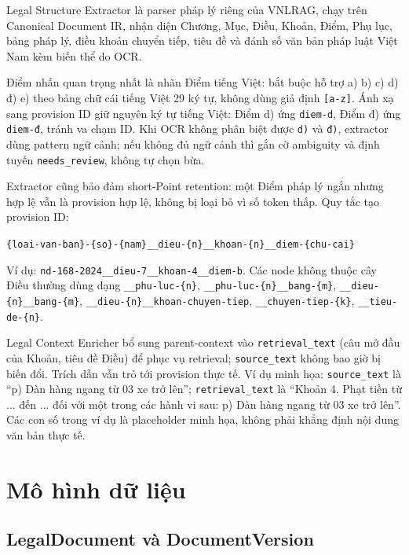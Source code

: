\documentclass[a4paper,12pt]{extreport}
\newcommand{\code}[1]{\texttt{#1}}
\begin{document}
Legal Structure Extractor là parser pháp lý riêng của VNLRAG, chạy trên Canonical Document IR, nhận diện Chương, Mục, Điều, Khoản, Điểm, Phụ lục, bảng pháp lý, điều khoản chuyển tiếp, tiêu đề và đánh số văn bản pháp luật Việt Nam kèm biến thể do OCR.

Điểm nhấn quan trọng nhất là nhãn Điểm tiếng Việt: bắt buộc hỗ trợ a) b) c) d) đ) e) theo bảng chữ cái tiếng Việt 29 ký tự, không dùng giả định \code{[a-z]}. Ánh xạ sang provision ID giữ nguyên ký tự tiếng Việt: Điểm d) ứng \code{diem-d}, Điểm đ) ứng \code{diem-đ}, tránh va chạm ID. Khi OCR không phân biệt được \code{d)} và \code{đ)}, extractor dùng pattern ngữ cảnh; nếu không đủ ngữ cảnh thì gắn cờ ambiguity và định tuyến \code{needs\_review}, không tự chọn bừa.

Extractor cũng bảo đảm short-Point retention: một Điểm pháp lý ngắn nhưng hợp lệ vẫn là provision hợp lệ, không bị loại bỏ vì số token thấp. Quy tắc tạo provision ID:

\begin{center}
\code{\{loai-van-ban\}\allowbreak-\{so\}\allowbreak-\{nam\}\allowbreak\_\_dieu\allowbreak-\{n\}\allowbreak\_\_khoan\allowbreak-\{n\}\allowbreak\_\_diem\allowbreak-\{chu-cai\}}
\end{center}

\begin{sloppypar}
Ví dụ: \code{nd-168-2024\_\_dieu-7\_\_khoan-4\_\_diem-b}. Các node không thuộc cây Điều thường dùng dạng \code{\_\_phu-luc-\{n\}}, \code{\_\_phu-luc-\{n\}\_\_bang-\{m\}}, \code{\_\_dieu-\{n\}\_\_bang-\{m\}}, \code{\_\_dieu-\{n\}\_\_khoan-chuyen-tiep}, \code{\_\_chuyen-tiep-\{k\}}, \code{\_\_tieu-de-\{n\}}.
\end{sloppypar}

Legal Context Enricher bổ sung parent-context vào \code{retrieval\_text} (câu mở đầu của Khoản, tiêu đề Điều) để phục vụ retrieval; \code{source\_text} không bao giờ bị biến đổi. Trích dẫn vẫn trỏ tới provision thực tế. Ví dụ minh họa: \code{source\_text} là ``p) Dàn hàng ngang từ 03 xe trở lên''; \code{retrieval\_text} là ``Khoản 4. Phạt tiền từ ... đến ... đối với một trong các hành vi sau: p) Dàn hàng ngang từ 03 xe trở lên''. Các con số trong ví dụ là placeholder minh họa, không phải khẳng định nội dung văn bản thực tế.

\section{Mô hình dữ liệu}

\subsection{LegalDocument và DocumentVersion}
\end{document}
